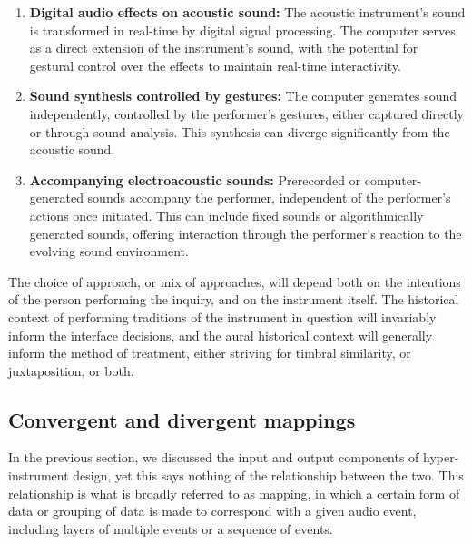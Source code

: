 \documentclass[12pt,twoside,maitrise]{dms_ks}
\theoremstyle{definition}
\begin{document}
{\begin{enumerate}
  \item \textbf{Digital audio effects on acoustic sound:} The acoustic instrument's sound is transformed in real-time by digital signal processing. 
The computer serves as a direct extension of the instrument's sound, with the potential for gestural control over the effects to maintain real-time interactivity.
  
  \item \textbf{Sound synthesis controlled by gestures:} The computer generates sound independently, controlled by the performer's gestures, either captured directly or through sound analysis. 
This synthesis can diverge significantly from the acoustic sound.
  
  \item \textbf{Accompanying electroacoustic sounds:} Prerecorded or computer-generated sounds accompany the performer, independent of the performer's actions once initiated. 
This can include fixed sounds or algorithmically generated sounds, offering interaction through the performer's reaction to the evolving sound environment.
\end{enumerate}



The choice of approach, or mix of approaches, will depend both on the intentions of the person performing the inquiry, and on the instrument itself. The historical context of performing traditions of the instrument in question will invariably inform the interface decisions, and the aural historical context will generally inform the method of treatment, either striving for timbral similarity, or juxtaposition, or both.

\subsection{Convergent and divergent mappings}

In the previous section, we discussed the input and output components of hyper-instrument design, yet this says nothing of the relationship between the two.
This relationship is what is broadly referred to as mapping, in which a certain form of data or grouping of data is made to correspond with a given audio event, including layers of multiple events or a sequence of events. 

}
\end{document}
